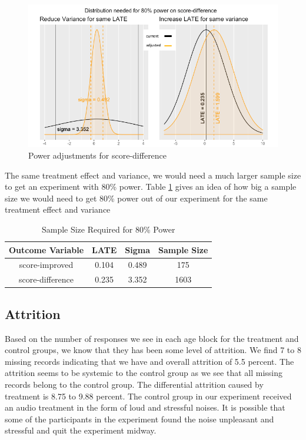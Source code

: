 \documentclass[journal,onecolumn, 12pt]{article}
\begin{document}
\begin{figure}[!h]
    \centering
    \includegraphics[scale=0.6]{images/power2.png}
    \caption{Power adjustments for score-difference}
    \label{fig: power2}
\end{figure}

\noindent
The same treatment effect and variance, we would need a much larger sample size to get an experiment with 80\% power. Table \ref{table: power3} gives an idea of how big a sample size we would need to get 80\% power out of our experiment for the same treatment effect and variance

\begin{table}[h]
\begin{center}
 \begin{tabular}{||c| c c c||} 
 \hline
 Outcome Variable & LATE & Sigma & Sample Size \\  
 \hline\hline
 score-improved & 0.104 & 0.489 & 175 \\ \hline
 score-difference & 0.235 & 3.352 & 1603 \\ \hline
 \end{tabular}
\caption{Sample Size Required for 80\% Power}
\label{table: power3}
\end{center}
\end{table}

\subsection {Attrition} \label{Attrition}
Based on the number of responses we see in each age block for the treatment and control groups, we know that they has been some level of attrition. We find 7 to 8 missing records indicating that we have and overall attrition of 5.5 percent. The attrition seems to be systemic to the control group as we see that all missing records belong to the control group. The differential attrition caused by treatment is 8.75 to 9.88 percent. The control group in our experiment received an audio treatment in the form of loud and stressful noises. It is possible that some of the participants in the experiment found the noise unpleasant and stressful and quit the experiment midway.
\end{document}

